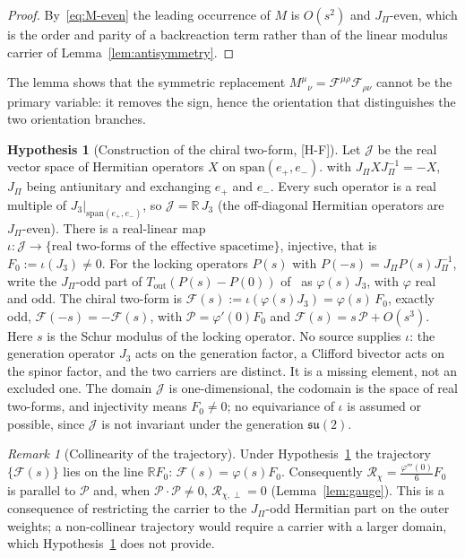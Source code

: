\documentclass[11pt]{article}
\theoremstyle{definition}
\newtheorem{hypothesis}{Hypothesis}
\theoremstyle{remark}
\newtheorem{remark}{Remark}
\newcommand{\JPi}{J_{\Pi}}
\newcommand{\Jthree}{J_{3}}
\newcommand{\Fchi}{\mathcal{F}}
\newcommand{\Pchi}{\mathcal{P}}
\begin{document}
    \begin{proof}
      By~\eqref{eq:M-even} the leading occurrence of $M$ is $O(s^2)$ and $\JPi$-even, which is the order and parity of a
      backreaction term rather than of the linear modulus carrier of Lemma~\ref{lem:antisymmetry}.
    \end{proof}

    The lemma shows that the symmetric replacement $M^{\mu}{}_{\nu} = \Fchi^{\mu\rho} \Fchi_{\rho\nu}$ cannot be the
    primary variable: it removes the sign, hence the orientation that distinguishes the two orientation branches.

    \begin{hypothesis}[Construction of the chiral two-form, {[H-F]}]
      \label{hyp:chiral-two-form}
      Let $\mathcal J$ be the real vector space of Hermitian operators $X$ on $\mathrm{span}(e_+,e_-)$.
      with $\JPi X\JPi^{-1}=-X$, $\JPi$ being antiunitary and exchanging $e_+$ and $e_-$.
      Every such operator is a real multiple of $\Jthree|_{\mathrm{span}(e_+,e_-)}$, so $\mathcal J=\mathbb R\,\Jthree$
      (the off-diagonal Hermitian operators are $\JPi$-even).
      There is a real-linear map $\iota:\mathcal J\to\{\text{real two-forms of the effective spacetime}\}$, injective,
      that
      is $F_0:=\iota(\Jthree)\neq0$.
      For the locking operators $P(s)$ with $P(-s)=\JPi P(s)\JPi^{-1}$, write the $\JPi$-odd part of
      $T_{\mathrm{out}}(P(s)-P(0))$ of~\cite{Beau2026prs} as $\varphi(s)\,\Jthree$, with $\varphi$ real and odd.
      The chiral two-form is $\Fchi(s):=\iota(\varphi(s)\Jthree)=\varphi(s)\,F_0$, exactly odd, $\Fchi(-s)=-\Fchi(s)$,
      with $\Pchi=\varphi'(0)F_0$ and $\Fchi(s)=s\,\Pchi+O(s^3)$.
      Here $s$ is the Schur modulus of the locking operator.
      No source supplies $\iota$: the generation operator $\Jthree$ acts on the generation factor, a Clifford bivector
      acts on the spinor factor, and the two carriers are distinct.
      It is a missing element, not an excluded one.
      The domain $\mathcal J$ is one-dimensional, the codomain is the space of real two-forms, and injectivity means
      $F_0\neq0$; no equivariance of $\iota$ is assumed or possible, since $\mathcal J$ is not invariant under the
      generation $\mathfrak{su}(2)$.
    \end{hypothesis}

    \begin{remark}[Collinearity of the trajectory]
      \label{rem:collinear}
      Under Hypothesis~\ref{hyp:chiral-two-form} the trajectory $\{\Fchi(s)\}$ lies on the line $\mathbb R F_0$:
      $\Fchi(s)=\varphi(s)F_0$.
      Consequently $\mathcal R_\chi=\tfrac{\varphi'''(0)}{6}F_0$ is parallel to $\Pchi$ and, when
      $\Pchi\cdot\Pchi\neq0$,
      $\mathcal R_{\chi,\perp}=0$
      (Lemma~\ref{lem:gauge}).
      This is a consequence of restricting the carrier to the $\JPi$-odd Hermitian part on the outer weights; a
      non-collinear trajectory would require a carrier with a larger domain, which Hypothesis~\ref{hyp:chiral-two-form}
      does not provide.
    \end{remark}
\end{document}
